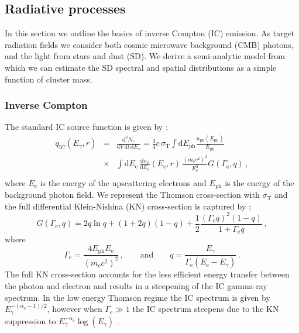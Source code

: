 \documentclass[10pt,aps,pra,reprint,amsmath,amsfonts,amssymb,showpacs]{revtex4-1}
\newcommand{\rmn}{\mathrm}
\newcommand{\ph}{\rmn{ph}}
\newcommand{\eph}{E_\ph}
\newcommand{\ee}{E_\rmn{e}}
\newcommand{\dd}{\rmn{d}}
\newcommand{\e}{\rmn{e}}
\newcommand{\eg}{E_\gamma}
\begin{document}
\subsection{Radiative processes}
In this section we outline the basics of inverse Compton (IC)
emission. As target radiation fields we consider both cosmic microwave
background (CMB) photons, and the light from stars and dust (SD). We
derive a semi-analytic model from which we can estimate the SD
spectral and spatial distributions as a simple function of cluster
mass.

\subsubsection{Inverse Compton}
\label{sect:IC}
The standard IC source function is given by
\cite{1979rpa..book.....R}:
\begin{eqnarray}
  q_{\rmn IC}(\eg, r) &=&  \frac{\dd^3 N_\gamma}{\dd V\,\dd t\,\dd \eg} = 
 \frac{3}{4}c\,\sigma_\rmn{T}
\int\dd \eph \frac{n_\rmn{ph}(\eph)}{\eph}\nonumber\\
&\times& \int \dd \ee\,\frac{\dd n_\e}{\dd \ee}(\ee,r)\,
 \frac{\left(m_\e c^2\right)^2}{\ee^2}G(\Gamma_\e,q)\,,\nonumber\\
  \label{eq:ICemiss}
\end{eqnarray}
where $\ee$ is the energy of the upscattering electrons and $\eph$ is
the energy of the background photon field. We represent the Thomson
cross-section with $\sigma_\rmn{T}$ and the full differential
Klein-Nishina (KN) cross-section is captured by
\cite{1970RvMP...42..237B}:
\begin{equation}
\label{eq:KN_spec}
G(\Gamma_\e,q) = 2q\ln{q}+(1+2q)(1-q)+ 
\frac{1}{2}\frac{\left(\Gamma_\e q\right)^2\left(1-q\right)}
     {1+\Gamma_\e q}\,,
\end{equation}
where
\begin{equation}
\Gamma_\e=\frac{4\eph \ee}{\left(m_\e c^2\right)^2}\,,\qquad \rmn{and} \qquad  
q=\frac{\eg}{\Gamma_\e\left(\ee-\eg\right)}\,.
\end{equation}
The full KN cross-section accounts for the less efficient energy
transfer between the photon and electron and results in a steepening
of the IC gamma-ray spectrum. In the low energy Thomson regime the IC
spectrum is given by $E_\gamma^{-(\alpha_\e-1)/2}$, however when
$\Gamma_\e \gg 1$ the IC spectrum steepens due to the KN suppression
to $\eg^{-\alpha_\e}\log(\eg)$ .
\end{document}
